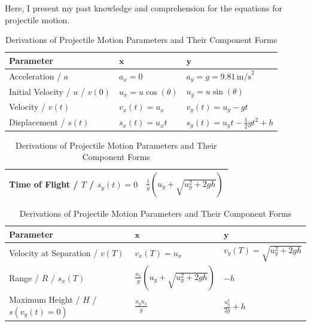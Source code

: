\documentclass[a4paper, 12pt]{report}
\begin{document}
    \centering
    Here, I present my past knowledge and comprehension for the equations for projectile motion.
    \renewcommand{\arraystretch}{1.5}
        
    \begin{table}[H]
        \centering
        \begin{tabular}{|>{\centering\arraybackslash}p{}|>{\centering\arraybackslash}p{}|>{\centering\arraybackslash}p{}|}
            \hline
            \textbf{Parameter} & $\bm{x}$ & $\bm{y}$ \\ \hline
            Acceleration / $a$ & $a_x = 0$ & $a_y = g = 9.81 \, \text{m/s}^2$ \\ \hline
            Initial Velocity / $u$ / $v(0)$ & $u_x = u \cos(\theta)$ & $u_y = u \sin(\theta)$ \\ \hline
            Velocity / $v(t)$ & $v_x(t) = u_x$ & $v_y(t) = u_y - gt$ \\ \hline
            Displacement / $s(t)$ & $s_x(t) = u_x t$ & $s_y(t) = u_y t - \frac{1}{2}gt^2 + h$ \\ \hline
        \end{tabular}
        \vspace{1em}  %
        
        \begin{tabular}{|>{\centering\arraybackslash}p{}|>{\centering\arraybackslash}p{}|}
            \hline
            Time of Flight / $T$ / $s_y(t)=0$ & $\frac{1}{g}\left(u_y + \sqrt{u_y^2 + 2gh}\right)$ \\ \hline
        \end{tabular}
        \vspace{1em}  %
        
        \begin{tabular}{|>{\centering\arraybackslash}p{}|>{\centering\arraybackslash}p{}|>{\centering\arraybackslash}p{}|}
            \hline
            \textbf{Parameter} & $\bm{x}$ & $\bm{y}$ \\ \hline
            Velocity at Separation / $v(T)$ & $v_x(T) = u_x$ & $v_y(T) = \sqrt{u_y^2 + 2gh}$ \\ \hline
            Range / $R$ / \(s_x(T)\)& $\frac{u_x}{g}\left(u_y + \sqrt{u_y^2 + 2gh}\right)$ & $-h$ \\ \hline
            Maximum Height / $H$ / $s(v_y(t)=0)$& \(\frac{u_y u_x}{g}\) & $\frac{u_y^2}{2g} + h$ \\ \hline
        \end{tabular}
        
        \caption{Derivations of Projectile Motion Parameters and Their Component Forms}
        \label{tab:combined_motion_parameters}
    \end{table}
        
\end{document}
